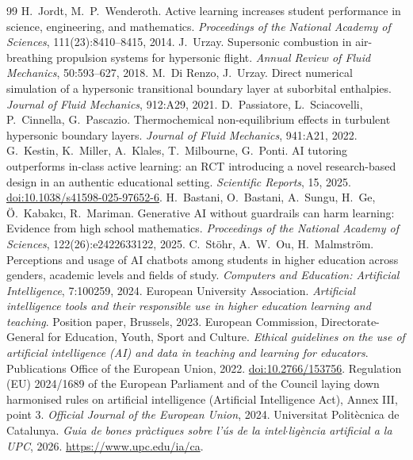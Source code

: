 \documentclass[11pt]{article}
\begin{document}
\begin{thebibliography}{99}
H.\ Jordt, M.\ P.\ Wenderoth. Active learning increases student performance in science,
engineering, and mathematics. \emph{Proceedings of the National Academy of Sciences},
111(23):8410--8415, 2014.
 J.\ Urzay. Supersonic combustion in air-breathing propulsion systems for
hypersonic flight. \emph{Annual Review of Fluid Mechanics}, 50:593--627, 2018.
 M.\ Di Renzo, J.\ Urzay. Direct numerical simulation of a
hypersonic transitional boundary layer at suborbital enthalpies. \emph{Journal of Fluid
Mechanics}, 912:A29, 2021.
 D.\ Passiatore, L.\ Sciacovelli, P.\ Cinnella, G.\ Pascazio.
Thermochemical non-equilibrium effects in turbulent hypersonic boundary layers.
\emph{Journal of Fluid Mechanics}, 941:A21, 2022.
 G.\ Kestin, K.\ Miller, A.\ Klales, T.\ Milbourne, G.\ Ponti. AI tutoring
outperforms in-class active learning: an RCT introducing a novel research-based design in an
authentic educational setting. \emph{Scientific Reports}, 15, 2025.
\href{https://doi.org/10.1038/s41598-025-97652-6}{doi:10.1038/s41598-025-97652-6}.
 H.\ Bastani, O.\ Bastani, A.\ Sungu, H.\ Ge, \"O.\ Kabakc\i{}, R.\
Mariman. Generative AI without guardrails can harm learning: Evidence from high school
mathematics. \emph{Proceedings of the National Academy of Sciences}, 122(26):e2422633122,
2025.
 C.\ St\"ohr, A.\ W.\ Ou, H.\ Malmstr\"om. Perceptions and usage of AI
chatbots among students in higher education across genders, academic levels and fields of
study. \emph{Computers and Education: Artificial Intelligence}, 7:100259, 2024.
\bibitem{EUA2023} European University Association. \emph{Artificial intelligence tools and
their responsible use in higher education learning and teaching}. Position paper,
Brussels, 2023.
 European Commission, Directorate-General for Education, Youth, Sport and
Culture. \emph{Ethical guidelines on the use of artificial intelligence (AI) and data in
teaching and learning for educators}. Publications Office of the European Union, 2022.
\href{https://data.europa.eu/doi/10.2766/153756}{doi:10.2766/153756}.
\bibitem{AIAct2024} Regulation (EU) 2024/1689 of the European Parliament and of the Council
laying down harmonised rules on artificial intelligence (Artificial Intelligence Act),
Annex III, point 3. \emph{Official Journal of the European Union}, 2024.
\bibitem{UPCAI2026} Universitat Polit\`ecnica de Catalunya. \emph{Guia de bones pr\`actiques
sobre l'\'us de la intel$\cdot$lig\`encia artificial a la UPC}, 2026.
\url{https://www.upc.edu/ia/ca}.

\end{thebibliography}
\end{document}

